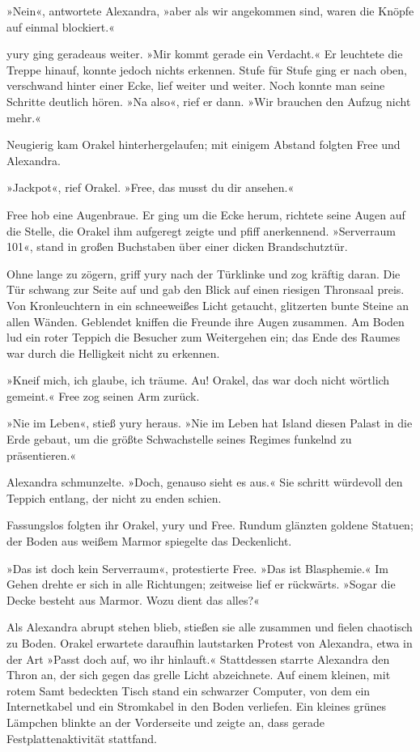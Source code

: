 »Nein«, antwortete Alexandra, »aber als wir angekommen sind, waren die Knöpfe auf einmal blockiert.«

yury ging geradeaus weiter. »Mir kommt gerade ein Verdacht.« Er leuchtete die Treppe hinauf, konnte jedoch nichts erkennen. Stufe für Stufe ging er nach oben, verschwand hinter einer Ecke, lief weiter und weiter. Noch konnte man seine Schritte deutlich hören. »Na also«, rief er dann. »Wir brauchen den Aufzug nicht mehr.«

Neugierig kam Orakel hinterhergelaufen; mit einigem Abstand folgten Free und Alexandra.

»Jackpot«, rief Orakel. »Free, das musst du dir ansehen.«

Free hob eine Augenbraue. Er ging um die Ecke herum, richtete seine Augen auf die Stelle, die Orakel ihm aufgeregt zeigte und pfiff anerkennend. »Serverraum 101«, stand in großen Buchstaben über einer dicken Brandschutztür.

Ohne lange zu zögern, griff yury nach der Türklinke und zog kräftig daran. Die Tür schwang zur Seite auf und gab den Blick auf einen riesigen Thronsaal preis. Von Kronleuchtern in ein schneeweißes Licht getaucht, glitzerten bunte Steine an allen Wänden. Geblendet kniffen die Freunde ihre Augen zusammen. Am Boden lud ein roter Teppich die Besucher zum Weitergehen ein; das Ende des Raumes war durch die Helligkeit nicht zu erkennen.

»Kneif mich, ich glaube, ich träume. Au! Orakel, das war doch nicht wörtlich gemeint.« Free zog seinen Arm zurück.

»Nie im Leben«, stieß yury heraus. »Nie im Leben hat Island diesen Palast in die Erde gebaut, um die größte Schwachstelle seines Regimes funkelnd zu präsentieren.«

Alexandra schmunzelte. »Doch, genauso sieht es aus.« Sie schritt würdevoll den Teppich entlang, der nicht zu enden schien.

Fassungslos folgten ihr Orakel, yury und Free. Rundum glänzten goldene Statuen; der Boden aus weißem Marmor spiegelte das Deckenlicht.

»Das ist doch kein Serverraum«, protestierte Free. »Das ist Blasphemie.« Im Gehen drehte er sich in alle Richtungen; zeitweise lief er rückwärts. »Sogar die Decke besteht aus Marmor. Wozu dient das alles?«

Als Alexandra abrupt stehen blieb, stießen sie alle zusammen und fielen chaotisch zu Boden. Orakel erwartete daraufhin lautstarken Protest von Alexandra, etwa in der Art »Passt doch auf, wo ihr hinlauft.« Stattdessen starrte Alexandra den Thron an, der sich gegen das grelle Licht abzeichnete. Auf einem kleinen, mit rotem Samt bedeckten Tisch stand ein schwarzer Computer, von dem ein Internetkabel und ein Stromkabel in den Boden verliefen. Ein kleines grünes Lämpchen blinkte an der Vorderseite und zeigte an, dass gerade Festplattenaktivität stattfand.

